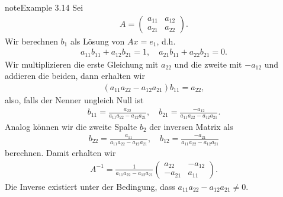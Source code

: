 \documentclass[letterpaper,10pt,english]{jupyterBook}
\begin{document}
\begin{sphinxadmonition}{note}{Example 3.14}
Sei
\begin{equation*}
\begin{split} A = \left( \begin{matrix} a_{11} & a_{12} \\ a_{21} & a_{22}  \end{matrix} \right).\end{split}
\end{equation*}
Wir berechnen \(b_1\) als Lösung von \(Ax = e_1\), d.h.
\begin{equation*}
\begin{split} a_{11} b_{11} + a_{12} b_{21} = 1, \quad a_{21} b_{11} + a_{22} b_{21} = 0.\end{split}
\end{equation*}
Wir multiplizieren die erste Gleichung mit \(a_{22}\) und die zweite mit \(-a_{12}\) und addieren die beiden, dann erhalten wir
\begin{equation*}
\begin{split} (a_{11} a_{22} - a_{12} a_{21}) b_{11} = a_{22},\end{split}
\end{equation*}
also, falls der Nenner ungleich Null ist
\begin{equation*}
\begin{split} b_{11} = \frac{a_{22}}{a_{11} a_{22} - a_{12} a_{21}}, \quad b_{21} = \frac{-a_{12}}{a_{11} a_{22} - a_{12} a_{21}}.\end{split}
\end{equation*}
Analog können wir die zweite Spalte \(b_2\) der inversen Matrix als
\begin{equation*}
\begin{split} b_{22} = \frac{a_{11}}{a_{11} a_{22} - a_{12} a_{21}}, \quad b_{12} = \frac{-a_{21}}{a_{11} a_{22} - a_{12} a_{21}} \end{split}
\end{equation*}
berechnen. Damit erhalten wir
\begin{equation*}
\begin{split} A^{-1} = \frac{1}{a_{11} a_{22} - a_{12} a_{21}} \left( \begin{matrix} a_{22} & -a_{12} \\ - a_{21} & a_{11}  \end{matrix} \right).\end{split}
\end{equation*}
Die Inverse existiert unter der Bedingung, dass \(a_{11} a_{22} - a_{12} a_{21} \neq 0\).
\end{sphinxadmonition}
\end{document}
